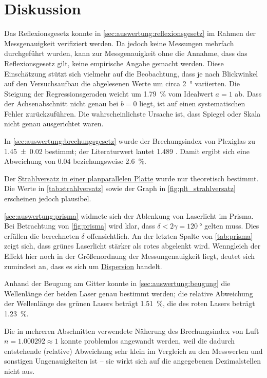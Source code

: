 \section{Diskussion}
\label{sec:diskussion}

Das Reflexionsgesetz konnte in \autoref{sec:auswertung:reflexionsgesetz}
im Rahmen der Messgenauigkeit verifiziert werden.
Da jedoch keine Messungen mehrfach durchgeführt wurden,
kann zur Messgenauigkeit ohne die Annahme, dass das Reflexionsgesetz gilt,
keine empirische Angabe gemacht werden.
Diese Einschätzung stützt sich vielmehr auf die Beobachtung,
dass je nach Blickwinkel auf den Versuchsaufbau
die abgelesenen Werte um circa \SI{2}{\degree} variierten.
%
Die Steigung der Regressionsgeraden weicht um \SI{1.79}{\percent} vom Idealwert $a = 1$ ab.
Dass der Achsenabschnitt nicht genau bei $b = 0$ liegt,
ist auf einen systematischen Fehler zurückzuführen.
Die wahrscheinlichste Ursache ist,
dass Spiegel oder Skala nicht genau ausgerichtet waren.


In \autoref{sec:auswertung:brechungsgesetz}
wurde der Brechungsindex von Plexiglas zu \num{1.45(2)} bestimmt;
der Literaturwert lautet \num{1.489} \cite{n_acryl}.
Damit ergibt sich eine Abweichung von \num{0.04} beziehungsweise \SI{2.6}{\percent}.


Der \hyperref[sec:auswertung:strahlversatz]{Strahlversatz in einer planparallelen Platte}
wurde nur theoretisch bestimmt.
Die Werte in \autoref{tab:strahlversatz}
sowie der Graph in \autoref{fig:plt_strahlversatz}
erscheinen jedoch plausibel.


\autoref{sec:auswertung:prisma} widmete sich der Ablenkung von Laserlicht im Prisma.
Bei Betrachtung von \autoref{fig:prisma} wird klar,
dass $\delta < 2\gamma = \SI{120}{\degree}$ gelten muss.
Dies erfüllen die berechneten $\delta$ offensichtlich.
%
An der letzten Spalte von \autoref{tab:prisma} zeigt sich,
dass grünes Laserlicht stärker als rotes abgelenkt wird.
Wenngleich der Effekt hier noch in der Größenordnung der Messungenauigkeit liegt,
deutet sich zumindest an,
dass es sich um \hyperref[sec:theorie:dispersion]{Dispersion} handelt.


Anhand der Beugung am Gitter konnte in \autoref{sec:auswertung:beugung}
die Wellenlänge der beiden Laser genau bestimmt werden;
die relative Abweichung der Wellenlänge
des grünen Lasers beträgt \SI{1.51}{\percent},
die des roten Lasers beträgt \SI{1.23}{\percent}.


Die in mehreren Abschnitten verwendete
Näherung des Brechungsindex von Luft $n = 1.000292 \approx 1$
konnte problemlos angewandt werden,
weil die dadurch entstehende (relative) Abweichung
sehr klein im Vergleich zu den Messwerten und sonstigen Ungenauigkeiten ist –
sie wirkt sich auf die angegebenen Dezimalstellen nicht aus.
